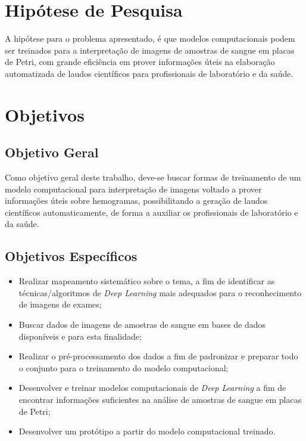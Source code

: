 \section{Hipótese de Pesquisa}
\label{sec:hipotese}

A hipótese para o problema apresentado, é que modelos computacionais podem ser treinados para a interpretação de imagens de amostras de sangue em placas de Petri, com grande eficiência em prover informações úteis na elaboração automatizada de laudos científicos para profissionais de laboratório e da saúde.


\section{Objetivos}
\label{sec:objetivos}

\subsection{Objetivo Geral}
Como objetivo geral deste trabalho, deve-se buscar formas de treinamento de um modelo computacional para interpretação de imagens voltado a prover informações úteis sobre hemogramas, possibilitando a geração de laudos científicos automaticamente, de forma a auxiliar os profissionais de laboratório e da saúde.


\subsection{Objetivos Específicos}
\begin{itemize}
	\item Realizar mapeamento sistemático sobre o tema, a fim de identificar as técnicas/algoritmos de \emph{Deep Learning} mais adequados para o reconhecimento de imagens de exames;
	\item Buscar dados de imagens de amostras de sangue em bases de dados disponíveis e para esta finalidade;
	\item Realizar o pré-processamento dos dados a fim de padronizar e preparar todo o conjunto para o treinamento do modelo computacional;
	\item Desenvolver e treinar modelos computacionais de \emph{Deep Learning} a fim de encontrar informações suficientes na análise de amostras de sangue em placas de Petri;
	\item Desenvolver um protótipo a partir do modelo computacional treinado.
\end{itemize}

